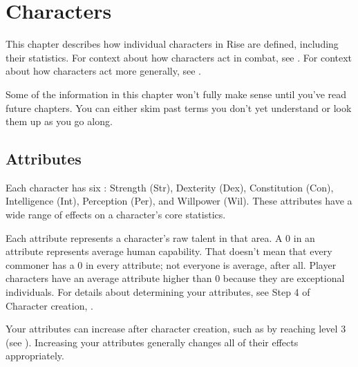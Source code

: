 \chapter{Characters}\label{Characters}

This chapter describes how individual characters in Rise are defined, including their statistics.
For context about how characters act in combat, see .
For context about how characters act more generally, see .

Some of the information in this chapter won't fully make sense until you've read future chapters.
You can either skim past terms you don't yet understand or look them up as you go along.

\section{Attributes}\label{Attributes}

  Each character has six : Strength (Str), Dexterity (Dex), Constitution (Con), Intelligence (Int), Perception (Per), and Willpower (Wil).
  These attributes have a wide range of effects on a character's core statistics.

  Each attribute represents a character's raw talent in that area.
  A 0 in an attribute represents average human capability.
  That doesn't mean that every commoner has a 0 in every attribute; not everyone is average, after all.
  Player characters have an average attribute higher than 0 because they are exceptional individuals.
  For details about determining your attributes, see Step 4 of Character creation, .

  Your attributes can increase after character creation, such as by reaching level 3 (see ).
  Increasing your attributes generally changes all of their effects appropriately.

